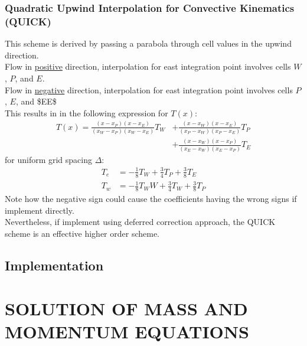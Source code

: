 \documentclass[11pt]{article}
\begin{document}
\subsubsection{Quadratic Upwind Interpolation for Convective Kinematics (QUICK)}
\label{sec:org0d26944}
This scheme is derived by passing a parabola through cell values in the upwind direction. \\
Flow in \uline{positive} direction, interpolation for east integration point involves cells \(W\), \(P\), and \(E\).\\
Flow in \uline{negative} direction, interpolation for east integration point involves cells \(P\), \(E\), and \$EE\$\\
This results in in the following expression for \(T(x)\):
\begin{equation*}
\begin{aligned}
T(x) = \frac{(x-x_P)(x-x_E)}{(x_W-x_P)(x_W-x_E)}T_W &+ \frac{(x-x_W)(x-x_E)}{(x_P-x_W)(x_P-x_E)}T_P\\
&+\frac{(x-x_W)(x-x_P)}{(x_E-x_W)(x_E-x_P)}T_E
\end{aligned}
\end{equation*}
for uniform grid spacing \(\Delta\):
\begin{equation*}
\begin{aligned}
T_e &= -\frac{1}{8}T_W + \frac{3}{4}T_P + \frac{3}{8}T_E\\
T_w &= -\frac{1}{8}T_WW + \frac{3}{4}T_W + \frac{3}{8}T_P
\end{aligned}
\end{equation*}
Note how the negative sign could cause the coefficients having the wrong signs if implement directly.\\
Nevertheless, if implement using deferred correction approach, the QUICK scheme is an effective higher order scheme. 

\subsection{Implementation}
\label{sec:org71de2a7}

\clearpage
\section{SOLUTION OF MASS AND MOMENTUM EQUATIONS}
\label{sec:orgcdadfb7}
\end{document}

